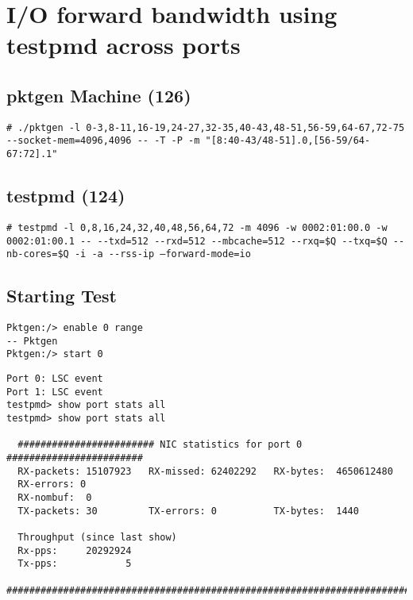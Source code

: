 \documentclass[letter]{article}
\begin{document}
{%
\section{I/O forward bandwidth using testpmd across ports}
{\setlength{\parindent}{0cm}

\subsection{pktgen Machine (126)}

\begin{lstlisting}
# ./pktgen -l 0-3,8-11,16-19,24-27,32-35,40-43,48-51,56-59,64-67,72-75 --socket-mem=4096,4096 -- -T -P -m "[8:40-43/48-51].0,[56-59/64-67:72].1"
\end{lstlisting}

\subsection{testpmd (124)}

\begin{lstlisting}[escapechar=!]
# testpmd -l 0,8,16,24,32,40,48,56,64,72 -m 4096 -w 0002:01:00.0 -w 0002:01:00.1 -- --txd=512 --rxd=512 --mbcache=512 --rxq=$Q --txq=$Q --nb-cores=$Q -i -a --rss-ip –forward-mode=io
\end{lstlisting}

\subsection{Starting Test}

\begin{lstlisting}[escapechar=!]
Pktgen:/> enable 0 range
-- Pktgen 
Pktgen:/> start 0
\end{lstlisting}

\begin{lstlisting}
Port 0: LSC event
Port 1: LSC event
testpmd> show port stats all
testpmd> show port stats all

  ######################## NIC statistics for port 0  ########################
  RX-packets: 15107923   RX-missed: 62402292   RX-bytes:  4650612480
  RX-errors: 0
  RX-nombuf:  0         
  TX-packets: 30         TX-errors: 0          TX-bytes:  1440

  Throughput (since last show)
  Rx-pps:     20292924
  Tx-pps:            5
  ############################################################################


\end{lstlisting}}}
\end{document}
